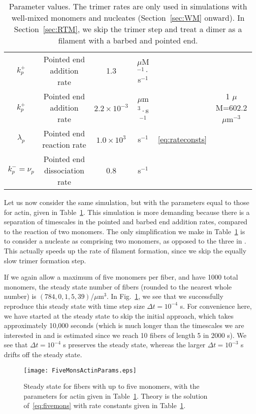 \documentclass[11pt]{article}
\begin{document}
\begin{table}
\begin{center}
\begin{tabular}{|c|c|c|c|c|c|}
$k_p^+$ & Pointed end addition rate& 1.3& $\mu$M$^{-1}\cdot$s$^{-1}$ & \cite{rosenbloom2021mechanism} & \\ 
$k_p^+$ &  Pointed end addition rate& $2.2 \times 10^{-3}$ & $\mu$m$^{3} \cdot$s$^{-1}$ & \cite{rosenbloom2021mechanism} & 1 $\mu$M=602.2 $\mu$m$^{-3}$ \\
$\lambda_p$ & Pointed end reaction rate & $1.0 \times 10^{3}$& s$^{-1}$ & \eqref{eq:rateconsts} & \\
$k_p^-=\nu_p$ & Pointed end dissociation rate & 0.8 & s$^{-1}$ & \cite{rosenbloom2021mechanism} &\\ \hline
\end{tabular}
\caption{\label{tab:params} Parameter values. The trimer rates are only used in simulations with well-mixed monomers and nucleates (Section\ \ref{sec:WM} onward). In Section\ \ref{sec:RTM}, we skip the trimer step and treat a dimer as a filament with a barbed and pointed end.}
\end{center}
\end{table}

Let us now consider the same simulation, but with the parameters equal to those for actin, given in Table\ \ref{tab:params}. This simulation is more demanding because there is a separation of timescales in the pointed and barbed end addition rates, compared to the reaction of two monomers. The only simplification we make in Table\ \ref{tab:params} is to consider a nucleate as comprising two monomers, as opposed to the three in \cite{rosenbloom2021mechanism}. This actually speeds up the rate of filament formation, since we skip the equally slow trimer formation step. 

If we again allow a maximum of five monomers per fiber, and have 1000 total monomers, the steady state number of fibers (rounded to the nearest whole number) is $(784,0,1,5,39)$/$\mu$m$^3$. In Fig.\ \ref{fig:FiveRealP}, we see that we successfully reproduce this steady state with time step size $\Delta t = 10^{-4}$ s. For convenience here, we have started at the steady state to skip the initial approach, which takes approximately 10,000 seconds (which is much longer than the timescales we are interested in and is estimated since we reach 10 fibers of length 5 in 2000 s). We see that $\Delta t = 10^{-4}$ s preserves the steady state, whereas the larger $\Delta t = 10^{-3}$ s drifts off the steady state.

\begin{figure}
\centering
\texttt{[image: FiveMonsActinParams.eps]}
\caption{\label{fig:FiveRealP}Steady state for fibers with up to five monomers, with the parameters for actin given in Table\ \ref{tab:params}. Theory is the solution of\ \eqref{eq:fivemons} with rate constants given in Table\ \ref{tab:params}.}
\end{figure}




\end{document}
